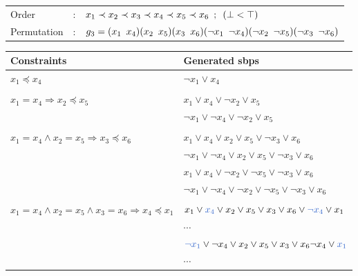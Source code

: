\begin{center}
	\begin{tabular}{lll}
		Order &:& $ x_1 \prec x_2 \prec x_3 \prec x_4 \prec x_5 \prec x_6 \enskip ; \enskip  (\bot < \top)$ \\
		Permutation &:& $g_3 = (x_1 \enskip x_4)(x_2 \enskip x_5)(x_3 \enskip x_6)(\neg x_1 \enskip \neg x_4)(\neg x_2 \enskip \neg x_5)(\neg x_3 \enskip \neg x_6)$
	\end{tabular}
	
	\vspace*{2\baselineskip}
	
	\begin{tabular}{ll}
		Constraints & Generated sbps\\
		\midrule
		$x_1 \preceq x_4$ & $ \neg x_1 \lor x_4$ \\
		&\\
		$x_1 = x_4 \Rightarrow x_2 \preceq x_5$ & $ x_1 \lor x_4 \lor \neg x_2 \lor x_5$\\
		&$ \neg x_1 \lor \neg x_4 \lor \neg x_2 \lor x_5$\\
		&\\
		$x_1 = x_4 \land x_2 = x_5 \Rightarrow x_3 \preceq x_6$ &
		  $ x_1 \lor x_4 \lor x_2 \lor x_5 \lor \neg x_3 \lor x_6$ \\
		& $ \neg x_1 \lor \neg x_4 \lor x_2 \lor x_5 \lor \neg x_3 \lor x_6$ \\
		& $ x_1 \lor x_4 \lor \neg x_2 \lor \neg x_5 \lor \neg x_3 \lor x_6$ \\
		& $ \neg x_1 \lor \neg x_4 \lor \neg x_2 \lor \neg x_5 \lor \neg x_3 \lor x_6$ \\ 
		&\\
		  $x_1 = x_4 \land x_2 = x_5 \land x_3 = x_6 \Rightarrow x_4 \preceq x_1$ &
		  $ x_1 \lor \textcolor{blue_1}{x_4} \lor x_2 \lor x_5 \lor  x_3 \lor x_6 \lor \textcolor{blue_1}{\neg x_4} \lor x_1$\\
		& $\cdots$ \\
		& $ \textcolor{blue_1}{\neg x_1} \lor \neg x_4 \lor  x_2 \lor x_5 \lor x_3 \lor x_6 \neg x_4 \lor \textcolor{blue_1}{x_1}$ \\ 
     	& $\cdots$ \\
	\end{tabular}
\end{center}





%
